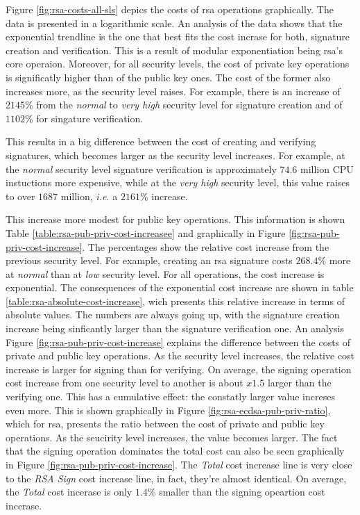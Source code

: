 \documentclass{llncs}
\begin{document}
Figure \ref{fig:rsa-costs-all-sls} depics the costs of \gls{rsa} operations graphically. The data is presented in a logarithmic
scale. An analysis of the data shows that the exponential trendline is the one that best fits the cost incrase for both, signature creation and 
verification. This is a result of modular exponentiation being \gls{rsa}'s core operaion. Moreover, for all security levels, the cost of 
private key operations is significatly higher than
of the public key ones. The cost of the former also increases more, as the security level raises. For example, there is an increase
of $2145\%$ from the \textit{normal} to \textit{very high} security level for signature creation and of $1102\%$ for singature verification.

This results in a big difference between the cost of creating and verifying signatures, which becomes larger as the security level increases.
For example, at the \textit{normal} security level signature verification is approximately $74.6$ million CPU instuctions more expensive,
while at the \textit{very high} security level, this value raises to over $1687$ million, \textit{i.e.} a $2161\%$ increase.

This increase more modest for public key operations. This information is shown Table \ref{table:rsa-pub-priv-cost-increasee} and graphically 
in Figure \ref{fig:rsa-pub-priv-cost-increase}. 
The percentages show the relative cost increase from the previous security level. For example, creating an \gls{rsa} signature costs 
$268.4\%$ more at \textit{normal} than at \textit{low} security level. For all operations, the cost increase is exponential. 
The consequences of the exponential cost increase are shown in table \ref{table:rsa-absolute-cost-increase}, wich presents this relative increase 
in terms of absolute values. The numbers are always going up, with the signature creation increase being sinficantly larger 
than the signature verification one. An analysis Figure \ref{fig:rsa-pub-priv-cost-increase}
explains the difference between the costs of private and public key operations. As the security level increases, the relative cost
increase is larger for signing than for verifying. On average, the signing operation cost increase from one security level to another 
is about $x1.5$ larger than the verifying one. This has a cumulative effect: the constatly larger value increses even more. 
This is shown graphically in Figure \ref{fig:rsa-ecdsa-pub-priv-ratio}, which for \gls{rsa}, presents the ratio between the cost of private and 
public key operations. As the seucirity level increases, the value becomes larger. The fact that the signing operation dominates the total cost
can also be seen graphically in Figure \ref{fig:rsa-pub-priv-cost-increase}. The \textit{Total} cost increase line is very close to the 
\textit{RSA Sign} cost increase line, in fact, they're almost identical. On average, the \textit{Total} cost incerase is only $1.4\%$ smaller
than the signing opeartion cost incerase.
\end{document}
